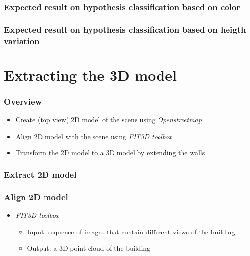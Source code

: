 \documentclass{beamer}
\begin{document}
\frame
{
	\frametitle{Expected result on hypothesis classification based on color}
}

\frame
{
	\frametitle{Expected result on hypothesis classification based on heigth variation}
}





\section{Extracting the 3D model}
\frame
{
	\frametitle{Overview}
	\begin{itemize}
	\item  <+-| alert@+> Create (top view) 2D model of the scene using \emph{Openstreetmap}
	\item  <+-| alert@+> Align 2D model with the scene using \emph{FIT3D toolbox}
	\item  <+-| alert@+> Transform the 2D model to a 3D model by extending the walls
	\end{itemize}
}

\frame
{
	\frametitle{Extract 2D model}
}

\frame
{
	\frametitle{Align 2D model}
	\begin{itemize}
	\item  <+-| alert@+> \emph{FIT3D toolbox}
		\begin{itemize}
		\item  <+-| alert@+> Input: sequence of images that contain different views of the building
		\item  <+-| alert@+> Output: a 3D point cloud of the building
		\end{itemize}
	\end{itemize}
}
\end{document}
